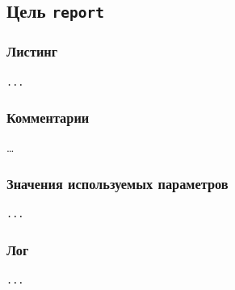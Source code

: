 \subsection{Цель \texttt{report}}

\subsubsection{Листинг}

\begin{lstlisting}[caption={Часть содержимого файла \texttt{build.xml}},captionpos=b]
...
\end{lstlisting}

\subsubsection{Комментарии}

\dots

\subsubsection{Значения используемых параметров}

\begin{lstlisting}[language=Properties,caption={Часть содержимого файла \texttt{build.properties}},captionpos=b]
...
\end{lstlisting}

\subsubsection{Лог}

\begin{lstlisting}[caption={Лог цели \texttt{report}},language={},captionpos=b]
...
\end{lstlisting}